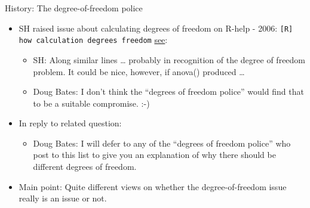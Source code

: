 \documentclass[
  ignorenonframetext,
]{beamer}
\providecommand{\tightlist}{%
  \setlength{\itemsep}{0pt}\setlength{\parskip}{0pt}}
\begin{document}
\begin{frame}

\begin{block}{History: The degree-of-freedom police}

\begin{itemize}
\item
  SH raised issue about calculating degrees of freedom on R-help - 2006:
  \texttt{[R] how calculation degrees freedom}
  \href{https://stat.ethz.ch/pipermail/r-help/2006-January/087013.html}{see}:

  \begin{itemize}
  \item
    SH: Along similar lines \ldots{} probably in recognition of the
    degree of freedom problem. It could be nice, however, if anova()
    produced \ldots{}
  \item
    Doug Bates: I don't think the ``degrees of freedom police'' would
    find that to be a suitable compromise. :-)
  \end{itemize}
\item
  In reply to related question:

  \begin{itemize}
  \tightlist
  \item
    Doug Bates: I will defer to any of the ``degrees of freedom police''
    who post to this list to give you an explanation of why there should
    be different degrees of freedom.
  \end{itemize}
\item
  Main point: Quite different views on whether the degree-of-freedom
  issue really is an issue or not.
\end{itemize}

\end{block}

\end{frame}
\end{document}
